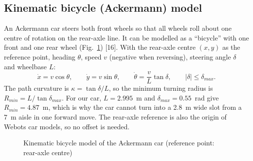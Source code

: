 \documentclass[12pt,a4paper]{article}
\begin{document}
\subsection{Kinematic bicycle (Ackermann) model}
An Ackermann car steers both front wheels so that all wheels roll about one centre of rotation on the rear-axle line. It can be modelled as a ``bicycle'' with one front and one rear wheel (Fig.~\ref{fig:bicycle}) [16]. With the rear-axle centre $(x, y)$ as the reference point, heading $\theta$, speed $v$ (negative when reversing), steering angle $\delta$ and wheelbase $L$:
\begin{equation}
\dot x = v\cos\theta, \qquad \dot y = v\sin\theta, \qquad \dot\theta = \frac{v}{L}\tan\delta, \qquad |\delta| \le \delta_{max}.
\label{eq:bicycle}
\end{equation}
The path curvature is $\kappa = \tan\delta / L$, so the minimum turning radius is $R_{min} = L/\tan\delta_{max}$. For our car, $L = 2.995$~m and $\delta_{max} = 0.55$~rad give $R_{min} = 4.87$~m, which is why the car cannot turn into a 2.8~m wide slot from a 7~m aisle in one forward move. The rear-axle reference is also the origin of Webots car models, so no offset is needed.

\begin{figure}[!htbp]
\centering
{}
\caption{Kinematic bicycle model of the Ackermann car (reference point: rear-axle centre)}
\label{fig:bicycle}
\end{figure}
\end{document}
